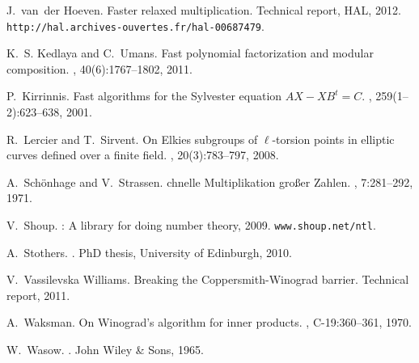 \documentclass[]{sig-alternate}
\begin{document}
\begin{thebibliography}{10}
J.~van~der Hoeven.
\newblock Faster relaxed multiplication.
\newblock Technical report, HAL, 2012.
\newblock \texttt{{http://hal.archives-ouvertes.fr/hal-00687479}}.

K.~S. Kedlaya and C.~Umans.
\newblock Fast polynomial factorization and modular composition.
, 40(6):1767--1802, 2011.

P.~Kirrinnis.
\newblock Fast algorithms for the {S}ylvester equation {$AX-XB^t=C$}.
, 259(1--2):623--638, 2001.

R.~Lercier and T.~Sirvent.
\newblock On {E}lkies subgroups of $\ell$-torsion points in elliptic curves
  defined over a finite field.
,
  20(3):783--797, 2008.

A.~Sch{\"o}nhage and V.~Strassen.
chnelle {M}ultiplikation gro\ss er {Z}ahlen.
, 7:281--292, 1971.

V.~Shoup.
: A library for doing number theory, 2009.
\newblock \texttt{www.shoup.net/ntl}.

A.~Stothers.
.
\newblock PhD thesis, University of Edinburgh, 2010.

V.~{Vassilevska Williams}.
\newblock Breaking the {C}oppersmith-{W}inograd barrier.
\newblock Technical report, 2011.

A.~Waksman.
\newblock On {W}inograd's algorithm for inner products.
, C-19:360--361, 1970.

W.~Wasow.
.
\newblock John Wiley \& Sons, 1965.

\end{thebibliography}
\end{document}
